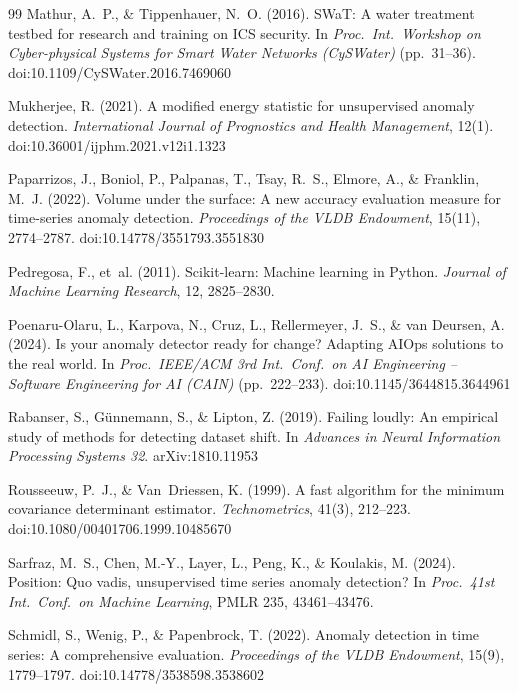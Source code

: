 \documentclass[11pt]{article}
\begin{document}
\begin{thebibliography}{99}
 Mathur, A.~P., \& Tippenhauer, N.~O. (2016). SWaT: A water treatment testbed for research and training on ICS security. In \emph{Proc.\ Int.\ Workshop on Cyber-physical Systems for Smart Water Networks (CySWater)} (pp.\ 31--36). doi:10.1109/CySWater.2016.7469060

 Mukherjee, R. (2021). A modified energy statistic for unsupervised anomaly detection. \emph{International Journal of Prognostics and Health Management}, 12(1). doi:10.36001/ijphm.2021.v12i1.1323

 Paparrizos, J., Boniol, P., Palpanas, T., Tsay, R.~S., Elmore, A., \& Franklin, M.~J. (2022). Volume under the surface: A new accuracy evaluation measure for time-series anomaly detection. \emph{Proceedings of the VLDB Endowment}, 15(11), 2774--2787. doi:10.14778/3551793.3551830

 Pedregosa, F., et~al. (2011). Scikit-learn: Machine learning in Python. \emph{Journal of Machine Learning Research}, 12, 2825--2830.

 Poenaru-Olaru, L., Karpova, N., Cruz, L., Rellermeyer, J.~S., \& van Deursen, A. (2024). Is your anomaly detector ready for change? Adapting AIOps solutions to the real world. In \emph{Proc.\ IEEE/ACM 3rd Int.\ Conf.\ on AI Engineering -- Software Engineering for AI (CAIN)} (pp.\ 222--233). doi:10.1145/3644815.3644961

 Rabanser, S., G\"unnemann, S., \& Lipton, Z. (2019). Failing loudly: An empirical study of methods for detecting dataset shift. In \emph{Advances in Neural Information Processing Systems 32}. arXiv:1810.11953

 Rousseeuw, P.~J., \& Van~Driessen, K. (1999). A fast algorithm for the minimum covariance determinant estimator. \emph{Technometrics}, 41(3), 212--223. doi:10.1080/00401706.1999.10485670

 Sarfraz, M.~S., Chen, M.-Y., Layer, L., Peng, K., \& Koulakis, M. (2024). Position: Quo vadis, unsupervised time series anomaly detection? In \emph{Proc.\ 41st Int.\ Conf.\ on Machine Learning}, PMLR 235, 43461--43476.

 Schmidl, S., Wenig, P., \& Papenbrock, T. (2022). Anomaly detection in time series: A comprehensive evaluation. \emph{Proceedings of the VLDB Endowment}, 15(9), 1779--1797. doi:10.14778/3538598.3538602


\end{thebibliography}
\end{document}
